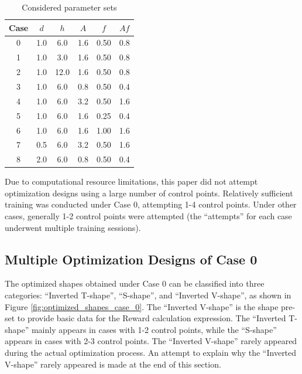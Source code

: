 \documentclass{article}
\begin{document}
\begin{table}[h]
    \centering
    \caption{Considered parameter sets}
    \label{tab:considered_parameter_sets}
    \begin{tabular}{c c c c c c}
        \hline
        \hline
        {Case}&{$d$}&{$h$}&{$A$}&{$f$}&{$Af$}\\
        \hline
        {0}&{1.0}&{6.0}&{1.6}&{0.50}&{0.8}\\
        \hline
        {1}&{1.0}&{3.0}&{1.6}&{0.50}&{0.8}\\
        \hline
        {2}&{1.0}&{12.0}&{1.6}&{0.50}&{0.8}\\
        \hline
        {3}&{1.0}&{6.0}&{0.8}&{0.50}&{0.4}\\
        \hline
        {4}&{1.0}&{6.0}&{3.2}&{0.50}&{1.6}\\
        \hline
        {5}&{1.0}&{6.0}&{1.6}&{0.25}&{0.4}\\
        \hline
        {6}&{1.0}&{6.0}&{1.6}&{1.00}&{1.6}\\
        \hline
        {7}&{0.5}&{6.0}&{3.2}&{0.50}&{1.6}\\
        \hline
        {8}&{2.0}&{6.0}&{0.8}&{0.50}&{0.4}\\
        \hline
        \hline
    \end{tabular}
\end{table}

Due to computational resource limitations, this paper did not attempt optimization designs using a large number of control points.
Relatively sufficient training was conducted under Case 0, attempting 1-4 control points.
Under other cases, generally 1-2 control points were attempted (the ``attempts'' for each case underwent multiple training sessions).

\subsection{Multiple Optimization Designs of Case 0}\indent

The optimized shapes obtained under Case 0 can be classified into three categories: ``Inverted T-shape'', ``S-shape'', and ``Inverted V-shape'', as shown in Figure \ref{fig:optimized_shapes_case_0}.
The ``Inverted V-shape'' is the shape pre-set to provide basic data for the Reward calculation expression.
The ``Inverted T-shape'' mainly appears in cases with 1-2 control points, while the ``S-shape'' appears in cases with 2-3 control points.
The ``Inverted V-shape'' rarely appeared during the actual optimization process.
An attempt to explain why the ``Inverted V-shape'' rarely appeared is made at the end of this section.
\end{document}
